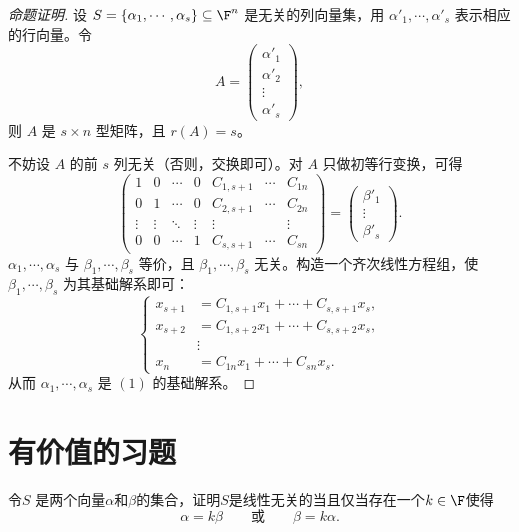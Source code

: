 \begin{proof}[命题证明]
	设 $S=\{\alpha_1,\cdots,\alpha_s\}\subseteq\F^n$ 是无关的列向量集，用 $\alpha'_1,\cdots,\alpha'_s$ 表示相应的行向量。令
	\[
	A=
	\begin{pmatrix}
		\alpha'_1\\
		\alpha'_2\\
		\vdots\\
		\alpha'_s
	\end{pmatrix},
	\]
	则 $A$ 是 $s\times n$ 型矩阵，且 $r(A)=s$。
	
	不妨设 $A$ 的前 $s$ 列无关（否则，交换即可）。对 $A$ 只做初等行变换，可得
	\[
	\begin{pmatrix}
		1&0&\cdots&0&C_{1,s+1}&\cdots&C_{1n}\\
		0&1&\cdots&0&C_{2,s+1}&\cdots&C_{2n}\\
		\vdots&\vdots&\ddots&\vdots&\vdots&&\vdots\\
		0&0&\cdots&1&C_{s,s+1}&\cdots&C_{sn}
	\end{pmatrix}
	=
	\begin{pmatrix}
		\beta'_1\\
		\vdots\\
		\beta'_s
	\end{pmatrix}.
	\]
	$\alpha_1,\cdots,\alpha_s$ 与 $\beta_1,\cdots,\beta_s$ 等价，且 $\beta_1,\cdots,\beta_s$ 无关。构造一个齐次线性方程组，使 $\beta_1,\cdots,\beta_s$ 为其基础解系即可：
	\begin{equation}\tag{1}
	\left\{
	\begin{aligned}
		x_{s+1}&=C_{1,s+1}x_1+\cdots+C_{s,s+1}x_s,\\
		x_{s+2}&=C_{1,s+2}x_1+\cdots+C_{s,s+2}x_s,\\
		&\vdots\\
		x_n&=C_{1n}x_1+\cdots+C_{sn}x_s.
	\end{aligned}
	\right.
	\end{equation}
	从而 $\alpha_1,\cdots,\alpha_s$ 是 $(1)$ 的基础解系。
\end{proof}

\section{有价值的习题}

\begin{problem}
	令$S$ 是两个向量$\alpha$和$\beta$的集合，证明$S$是线性无关的当且仅当存在一个$k\in\F$使得
	\[
	\alpha=k\beta\qquad\text{或}\qquad\beta=k\alpha.
	\]
\end{problem}

